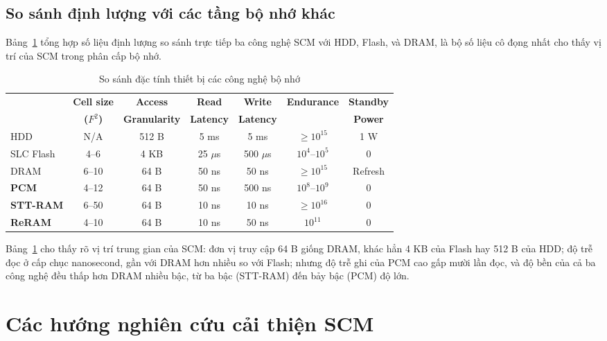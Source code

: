 \documentclass[12pt,a4paper]{article}
\begin{document}
\subsection{So sánh định lượng với các tầng bộ nhớ khác}

Bảng~\ref{tab:scm-comparison} tổng hợp số liệu định lượng so sánh trực tiếp ba công nghệ SCM với HDD, Flash, và DRAM, là bộ số liệu cô đọng nhất cho thấy vị trí của SCM trong phân cấp bộ nhớ.

\begin{table}[h]
\centering
\caption{So sánh đặc tính thiết bị các công nghệ bộ nhớ \cite{kamath2019}}
\label{tab:scm-comparison}
\begin{tabular}{lcccccc}
\toprule
& \textbf{Cell size} & \textbf{Access} & \textbf{Read} & \textbf{Write} & \textbf{Endurance} & \textbf{Standby} \\
& \textbf{($F^2$)} & \textbf{Granularity} & \textbf{Latency} & \textbf{Latency} & & \textbf{Power} \\
\midrule
HDD & N/A & 512 B & 5 ms & 5 ms & $\geq 10^{15}$ & 1 W \\
SLC Flash & 4--6 & 4 KB & 25 $\mu$s & 500 $\mu$s & $10^4$--$10^5$ & 0 \\
DRAM & 6--10 & 64 B & 50 ns & 50 ns & $\geq 10^{15}$ & Refresh \\
\textbf{PCM} & 4--12 & 64 B & 50 ns & 500 ns & $10^8$--$10^9$ & 0 \\
\textbf{STT-RAM} & 6--50 & 64 B & 10 ns & 10 ns & $\geq 10^{16}$ & 0 \\
\textbf{ReRAM} & 4--10 & 64 B & 10 ns & 50 ns & $10^{11}$ & 0 \\
\bottomrule
\end{tabular}
\end{table}

Bảng~\ref{tab:scm-comparison} cho thấy rõ vị trí trung gian của SCM: đơn vị truy cập 64 B giống DRAM, khác hẳn 4 KB của Flash hay 512 B của HDD; độ trễ đọc ở cấp chục nanosecond, gần với DRAM hơn nhiều so với Flash; nhưng độ trễ ghi của PCM cao gấp mười lần đọc, và độ bền của cả ba công nghệ đều thấp hơn DRAM nhiều bậc, từ ba bậc (STT-RAM) đến bảy bậc (PCM) độ lớn.

\section{Các hướng nghiên cứu cải thiện SCM}
\label{sec:scm-research}
\end{document}
